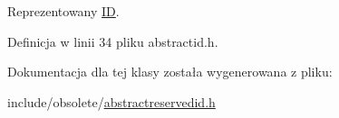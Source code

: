 Reprezentowany \hyperlink{classobsolete_1_1ID}{ID}. 



Definicja w linii 34 pliku abstractid.h.



Dokumentacja dla tej klasy została wygenerowana z pliku:\begin{DoxyCompactItemize}
\item 
include/obsolete/\hyperlink{abstractreservedid_8h}{abstractreservedid.h}\end{DoxyCompactItemize}
